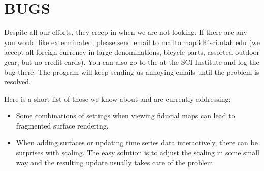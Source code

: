 
\section{BUGS}
\label{sec:bugs}

Despite all our efforts, they creep in when we are not looking.  If
there are any you would like exterminated, please send email to
 {mailto:map3d@sci.utah.edu} (we
accept all foreign currency in large denominations, bicycle parts, assorted
outdoor gear, but no credit cards).  You can also go to the 
 at the SCI
Institute and log the bug there.  The program will keep sending us annoying
emails until the problem is resolved.

Here is a short list of those we know about and are currently addressing:

\begin{itemize}
  \item Some combinations of settings when viewing fiducial maps can lead
    to fragmented surface rendering.
  \item When adding surfaces or updating time series data interactively,
    there can be surprises with scaling.  The easy solution is to adjust
    the scaling in some small way and the resulting update usually takes
    care of the problem.
\end{itemize}


